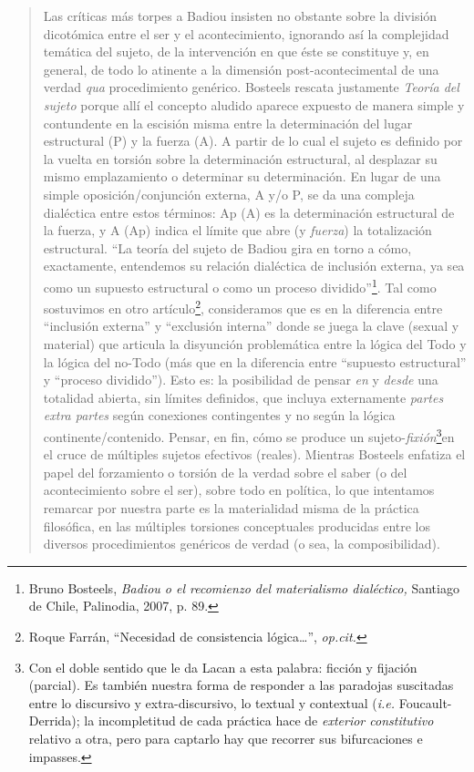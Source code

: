 \begin{quote}
Las críticas más torpes a Badiou  insisten no obstante sobre la división dicotómica entre el ser y el acontecimiento, ignorando así la complejidad temática del sujeto, de la intervención en que éste se constituye y, en general, de todo lo atinente a la dimensión post-acontecimental de una verdad \emph{qua} procedimiento genérico. Bosteels rescata justamente \emph{Teoría del sujeto} porque allí el concepto aludido aparece expuesto de manera simple y contundente en la escisión misma entre la determinación del lugar estructural (P) y la fuerza (A). A partir de lo cual el sujeto es definido por la vuelta en torsión sobre la determinación estructural, al desplazar su mismo emplazamiento o determinar su determinación. En lugar de una simple oposición/conjunción externa, A y/o P, se da una compleja dialéctica entre estos términos: Ap (A) es la determinación estructural de la fuerza, y A (Ap) indica el límite que abre (y \emph{fuerza}) la totalización estructural. \enquote{La teoría del sujeto de Badiou gira en torno a cómo, exactamente, entendemos su relación dialéctica de inclusión externa, ya sea como un supuesto estructural o como un proceso dividido}\footnote{Bruno Bosteels, \emph{Badiou o el recomienzo del materialismo dialéctico,} Santiago de Chile, Palinodia, 2007, p. 89.}. Tal como sostuvimos en otro artículo\footnote{Roque Farrán, \enquote{Necesidad de consistencia lógica\ldots}, \emph{op.cit.}}, consideramos que es en la diferencia entre \enquote{inclusión externa} y \enquote{exclusión interna} donde se juega la clave (sexual y material) que articula la disyunción problemática entre la lógica del Todo y la lógica del no-Todo (más que en la diferencia entre \enquote{supuesto estructural} y \enquote{proceso dividido}). Esto es: la posibilidad de pensar \emph{en} y \emph{desde} una totalidad abierta, sin límites definidos, que incluya externamente \emph{partes extra partes} según conexiones contingentes y no según la lógica continente/contenido. Pensar, en fin, cómo se produce un sujeto-\emph{fixión}\footnote{Con el doble sentido que le da Lacan a esta palabra: ficción y fijación (parcial). Es también nuestra forma de responder a las paradojas suscitadas entre lo discursivo y extra-discursivo, lo textual y contextual (\emph{i.e.} Foucault-Derrida); la incompletitud de cada práctica hace de \emph{exterior constitutivo} relativo a otra, pero para captarlo hay que recorrer sus bifurcaciones e impasses.}en el cruce de múltiples sujetos efectivos (reales). Mientras Bosteels enfatiza el papel del forzamiento o torsión de la verdad sobre el saber (o del acontecimiento sobre el ser), sobre todo en política, lo que intentamos remarcar por nuestra parte es la materialidad misma de la práctica filosófica, en las múltiples torsiones conceptuales producidas entre los diversos procedimientos genéricos de verdad (o sea, la composibilidad).


\end{quote}
